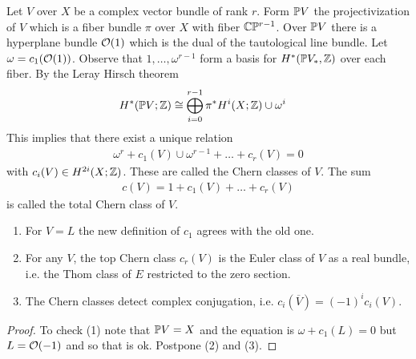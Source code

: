 \documentclass[12pt]{article}
\begin{document}
\begin{definition}
    Let $V$ over $X$ be a complex vector bundle of rank $r$. Form $\P V$ the projectivization of $V$ which is a fiber bundle $\pi$ over $X$ with fiber $\C\P^{r-1}$. Over $\P V$ there is a hyperplane bundle $\cO(1)$ which is the dual of the tautological line bundle. Let $\omega = c_1(\cO(1))$. Observe that $1,\dots, \omega^{r-1}$ form a basis for $H^*(\P V_*,\Z)$ over each fiber. By the Leray Hirsch theorem \begin{align*}
        H^*(\P V; \Z) &\cong \bigoplus_{i=0}^{r-1} \pi^* H^i(X; \Z) \cup \omega^i
    \end{align*}
This implies that there exist a unique relation \begin{align*}
        \omega^r + c_1(V) \cup \omega^{r-1} + \dots + c_r(V) = 0
\end{align*} with $c_i(V) \in H^{2i}(X; \Z)$. These are called the Chern classes of $V$. The sum \begin{align*}
    c(V) = 1 + c_1(V) + \dots + c_r(V)
\end{align*} is called the total Chern class of $V$.
\end{definition}

\begin{theorem}
    \begin{enumerate}
        \item For $V = L$ the new definition of $c_1$ agrees with the old one.
        \item For any $V$, the top Chern class $c_r(V)$ is the Euler class of $V$ as a real bundle, i.e. the Thom class of $E$ restricted to the zero section.
        \item The Chern classes detect complex conjugation, i.e. $c_i(\overline{V}) = (-1)^i c_i(V)$.
    \end{enumerate}
\end{theorem}

\begin{proof}
    To check (1) note that $\P V = X$ and the equation is $\omega + c_1(L) = 0$ but $L = \cO(-1)$ and so that is ok. Postpone (2) and (3).
\end{proof}
\end{document}
